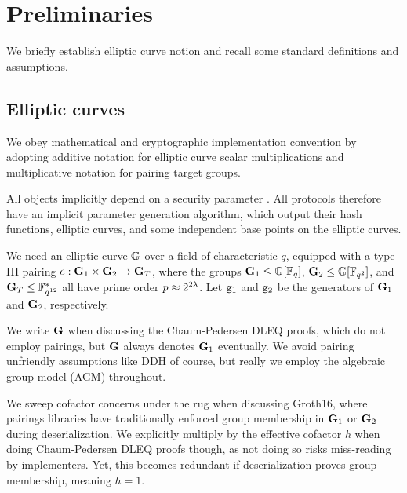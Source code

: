 
\section{Preliminaries} %
\label{sec:background}

We briefly establish elliptic curve notion and recall some standard
definitions and assumptions.



\subsection{Elliptic curves}
\label{sec:ec_background}


We obey mathematical and cryptographic implementation convention by 
adopting additive notation for elliptic curve  scalar multiplications and 
multiplicative notation for pairing target groups.

All objects implicitly depend on a security parameter \secparam.
All protocols therefore have an implicit parameter generation algorithm,
which output their hash functions, elliptic curves, and some independent base points on the elliptic curves.

We need an elliptic curve ${\mathbb{G}}$ over a field of characteristic $q$,
equipped with a type III pairing $e : {\mathbf{G}}_1 \times {\mathbf{G}}_2 \to {\mathbf{G}}_T$,
where the groups  ${\mathbf{G}}_1 \le {\mathbb{G}}[\mathbb{F}_q]$, ${\mathbf{G}}_2 \le {\mathbb{G}}[\mathbb{F}_{q^2}]$, and
${\mathbf{G}}_T \le \mathbb{F}^*_{q^{12}}$ all have prime order $p \approx 2^{2\lambda}$. 
Let $\mathsf{g}_1$ and $\mathsf{g}_2$ be the generators of ${\mathbf{G}}_1$ and ${\mathbf{G}}_2$, respectively. 

We write ${\mathbf{G}}$ when discussing the Chaum-Pedersen DLEQ proofs, which do
not employ pairings, but ${\mathbf{G}}$ always denotes ${\mathbf{G}}_1$ eventually.
We avoid pairing unfriendly assumptions like DDH of course, but really
we employ the algebraic group model (AGM) throughout.

We sweep cofactor concerns under the rug when discussing Groth16,
where pairings libraries have traditionally enforced group membership in
${\mathbf{G}}_1$ or ${\mathbf{G}}_2$ during deserialization.  We explicitly multiply by the
effective cofactor $h$ when doing Chaum-Pedersen DLEQ proofs though, as not
doing so risks miss-reading by implementers.  Yet, this becomes redundant
if deserialization proves group membership, meaning $h=1$.

